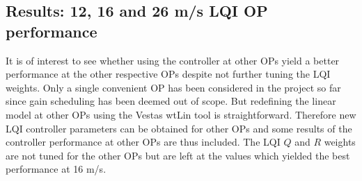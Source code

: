 \clearpage
\subsection{Results: 12, 16 and 26 m/s LQI OP performance} \label{sec:test_vts_part2}
It is of interest to see whether using the controller at other OPs yield a better performance at the other respective OPs despite not further tuning the LQI weights. Only a single convenient OP has been considered in the project so far since gain scheduling has been deemed out of scope. But redefining the linear model at other OPs using the Vestas wtLin tool is straightforward. Therefore new LQI controller parameters can be obtained for other OPs and some results of the controller performance at other OPs are thus included. The LQI $ Q $ and $ R $ weights are not tuned for the other OPs but are left at the values which yielded the best performance at 16 m/s.

